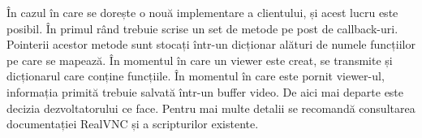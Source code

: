 În cazul în care se dorește o nouă implementare a clientului, și acest lucru este posibil. În primul rând trebuie scrise un set de metode pe post de callback-uri. Pointerii acestor metode sunt stocați într-un dicționar alături de numele funcțiilor pe care se mapează. În momentul în care un viewer este creat, se transmite și dicționarul care conține funcțiile. În momentul în care este pornit viewer-ul, informația primită trebuie salvată într-un buffer video. De aici mai departe este decizia dezvoltatorului ce face. Pentru mai multe detalii se recomandă consultarea documentației RealVNC și a scripturilor existente.